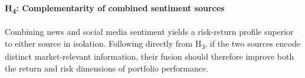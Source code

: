 \paragraph{H\textsubscript{4}: Complementarity of combined sentiment sources} Combining news and social media sentiment yields a risk-return profile superior to either source in isolation. Following directly from H\textsubscript{3}, if the two sources encode distinct market-relevant information, their fusion should therefore improve both the return and risk dimensions of portfolio performance.%
